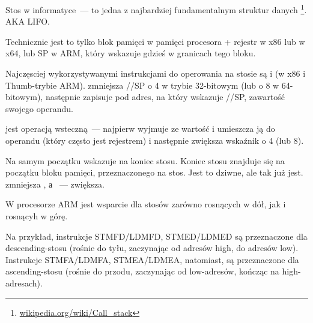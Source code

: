 \mysection{\Stack}
\label{sec:stack}
\myindex{\Stack}

Stos w informatyce~--- to jedna z najbardziej fundamentalnym struktur danych
\footnote{\href{http://go.yurichev.com/17119}{wikipedia.org/wiki/Call\_stack}}.
\ac{AKA} \ac{LIFO}.

Technicznie jest to tylko blok pamięci w pamięci procesora + rejestr \ESP w x86 lub \RSP w x64, lub \ac{SP} w ARM, który wskazuje gdzieś w granicach tego bloku.

Najczęsciej wykorzystywanymi instrukcjami do operowania na stosie są \PUSH i \POP (w x86 i Thumb-trybie ARM). 
\PUSH zmniejsza \ESP/\RSP/\ac{SP} o 4 w trybie 32-bitowym (lub o 8 w 64-bitowym),
następnie zapisuje pod adres, na który wskazuje \ESP/\RSP/\ac{SP}, zawartość swojego operandu.

\POP jest operacją wsteczną~--- najpierw wyjmuje ze  wartość i umieszcza ją do operandu 
(który często jest rejestrem) i następnie zwiększa wskaźnik o 4 (lub 8).

Na samym początku  wskazuje na koniec stosu.
Koniec stosu znajduje się na początku bloku pamięci, przeznaczonego na stos. Jest to dziwne, ale tak już jest.
\PUSH zmniejsza , а \POP~--- zwiększa.

W procesorze ARM jest wsparcie dla stosów zarówno rosnących w dół, jak i rosnącyh w górę.


Na przykład, instrukcje \ac{STMFD}/\ac{LDMFD}, \ac{STMED}/\ac{LDMED} są przeznaczone dla descending-stosu (rośnie do tyłu, zaczynając od adresów high, do adresów low).\\
Instrukcje \ac{STMFA}/\ac{LDMFA}, \ac{STMEA}/\ac{LDMEA}, natomiast, są przeznaczone dla ascending-stosu (rośnie do przodu, zaczynając od low-adresów, kończąc na high-adresach).


